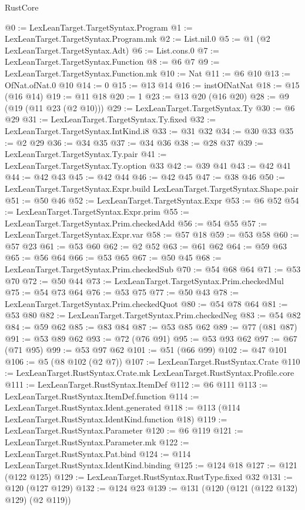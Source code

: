 \begin{lexlean}{RustCore}
\begin{coremodule}
{\begin{coremodule}
{{{{{@0 := LexLeanTarget.TargetSyntax.Program
@1 := LexLeanTarget.TargetSyntax.Program.mk
@2 := List.nil.{0}
@5 := @1 (@2 LexLeanTarget.TargetSyntax.Adt)
@6 := List.cons.{0}
@7 := LexLeanTarget.TargetSyntax.Function
@8 := @6 @7
@9 := LexLeanTarget.TargetSyntax.Function.mk
@10 := Nat
@11 := @6 @10
@13 := OfNat.ofNat.{0} @10
@14 := 0
@15 := @13 @14
@16 := instOfNatNat
@18 := @15 (@16 @14)
@19 := @11 @18
@20 := 1
@23 := @13 @20 (@16 @20)
@28 := @9 (@19 (@11 @23 (@2 @10)))
@29 := LexLeanTarget.TargetSyntax.Ty
@30 := @6 @29
@31 := LexLeanTarget.TargetSyntax.Ty.fixed
@32 := LexLeanTarget.TargetSyntax.IntKind.i8
@33 := @31 @32
@34 := @30 @33
@35 := @2 @29
@36 := @34 @35
@37 := @34 @36
@38 := @28 @37
@39 := LexLeanTarget.TargetSyntax.Ty.pair
@41 := LexLeanTarget.TargetSyntax.Ty.option @33
@42 := @39 @41
@43 := @42 @41
@44 := @42 @43
@45 := @42 @44
@46 := @42 @45
@47 := @38 @46
@50 := LexLeanTarget.TargetSyntax.Expr.build LexLeanTarget.TargetSyntax.Shape.pair
@51 := @50 @46
@52 := LexLeanTarget.TargetSyntax.Expr
@53 := @6 @52
@54 := LexLeanTarget.TargetSyntax.Expr.prim
@55 := LexLeanTarget.TargetSyntax.Prim.checkedAdd
@56 := @54 @55
@57 := LexLeanTarget.TargetSyntax.Expr.var
@58 := @57 @18
@59 := @53 @58
@60 := @57 @23
@61 := @53 @60
@62 := @2 @52
@63 := @61 @62
@64 := @59 @63
@65 := @56 @64
@66 := @53 @65
@67 := @50 @45
@68 := LexLeanTarget.TargetSyntax.Prim.checkedSub
@70 := @54 @68 @64
@71 := @53 @70
@72 := @50 @44
@73 := LexLeanTarget.TargetSyntax.Prim.checkedMul
@75 := @54 @73 @64
@76 := @53 @75
@77 := @50 @43
@78 := LexLeanTarget.TargetSyntax.Prim.checkedQuot
@80 := @54 @78 @64
@81 := @53 @80
@82 := LexLeanTarget.TargetSyntax.Prim.checkedNeg
@83 := @54 @82
@84 := @59 @62
@85 := @83 @84
@87 := @53 @85 @62
@89 := @77 (@81 @87)
@91 := @53 @89 @62
@93 := @72 (@76 @91)
@95 := @53 @93 @62
@97 := @67 (@71 @95)
@99 := @53 @97 @62
@101 := @51 (@66 @99)
@102 := @47 @101
@106 := @5 (@8 @102 (@2 @7))
@107 := LexLeanTarget.RustSyntax.Crate
@110 := LexLeanTarget.RustSyntax.Crate.mk LexLeanTarget.RustSyntax.Profile.core
@111 := LexLeanTarget.RustSyntax.ItemDef
@112 := @6 @111
@113 := LexLeanTarget.RustSyntax.ItemDef.function
@114 := LexLeanTarget.RustSyntax.Ident.generated
@118 := @113 (@114 LexLeanTarget.RustSyntax.IdentKind.function @18)
@119 := LexLeanTarget.RustSyntax.Parameter
@120 := @6 @119
@121 := LexLeanTarget.RustSyntax.Parameter.mk
@122 := LexLeanTarget.RustSyntax.Pat.bind
@124 := @114 LexLeanTarget.RustSyntax.IdentKind.binding
@125 := @124 @18
@127 := @121 (@122 @125)
@129 := LexLeanTarget.RustSyntax.RustType.fixed @32
@131 := @120 (@127 @129)
@132 := @124 @23
@139 := @131 (@120 (@121 (@122 @132) @129) (@2 @119))
}}}}}
\end{coremodule}}
\end{coremodule}
\end{lexlean}
